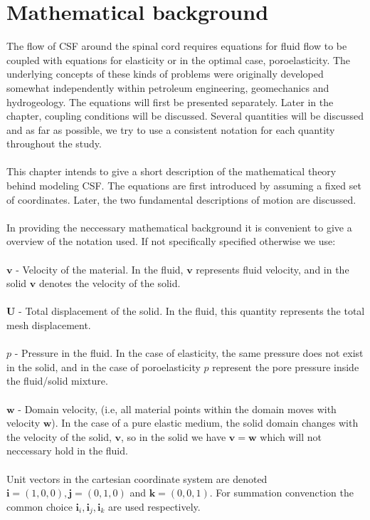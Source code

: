 \chapter{Mathematical background}
The flow of CSF around the spinal cord requires equations for fluid flow to be coupled with equations for elasticity or in the optimal case, poroelasticity. The underlying concepts of these kinds of problems were originally developed somewhat independently within petroleum engineering, geomechanics and hydrogeology. The equations will first be presented separately. Later in the chapter, coupling conditions will be discussed. Several quantities will be discussed and as far as possible, we try to use a consistent notation for each quantity throughout the study. 
\\
\\
This chapter intends to give a short description of the mathematical theory behind modeling CSF. The equations are first introduced by assuming a fixed set of coordinates. Later, the two fundamental descriptions of motion are discussed. \\
\\
In providing the neccessary mathematical background it is convenient to give a overview of the notation used. If not specifically specified otherwise we use: \\ \\
$\mathbf{v}$ - Velocity of the material. In the fluid, $\mathbf{v}$ represents fluid velocity, and in the solid $\mathbf{v}$ denotes the velocity of the solid.
\\ \\
$ \mathbf{U}$ - Total displacement of the solid. In the fluid, this quantity represents the total mesh displacement. 
\\
\\
$p$ - Pressure in the fluid. In the case of elasticity, the same pressure does not exist in the solid, and in the case of poroelasticity $p$ represent the pore pressure inside the fluid/solid mixture. 
\\
\\
$\mathbf{w}$ - Domain velocity, (i.e, all material points within the domain moves with velocity $\mathbf{w}$). In the case of a pure elastic medium, the solid domain changes with the velocity of the solid, $\mathbf{v}$, so in the solid we have $\mathbf{v} = \mathbf{w}$ which will not neccessary hold in the fluid.
\\
\\
Unit vectors in the cartesian coordinate system are denoted $\mathbf{i} = (1,0,0), \mathbf{j} = (0,1,0)$ and $\mathbf{k} = (0,0,1)$. For summation convenction the common choice $\mathbf{i}_i, \mathbf{i}_j, \mathbf{i}_k$ are used respectively. 
